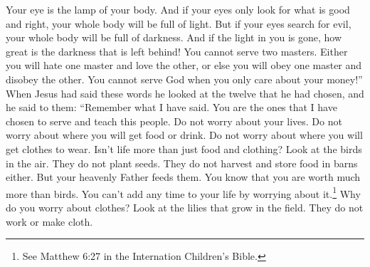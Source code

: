 Your eye is the lamp of your body. And if your eyes only look for what is good and right, your whole body will be full of light.
\bverse \iffalse But if thine eye be evil, thy whole body shall be full of darkness. If, therefore, the light that is in thee be darkness, how great is that darkness! \fi
But if your eyes search for evil, your whole body will be full of darkness. And if the light in you is gone, how great is the darkness that is left behind!
\bverse \iffalse No man can serve two masters; for either he will hate the one and love the other, or else he will hold to the one and despise the other. Ye cannot serve God and Mammon. \fi
You cannot serve two masters. Either you will hate one master and love the other, or else you will obey one master and disobey the other. You cannot serve God when you only care about your money!''
\bverse \iffalse And now it came to pass that when Jesus had spoken these words he looked upon the twelve whom he had chosen, and said unto them: Remember the words which I have spoken. For behold, ye are they whom I have chosen to minister unto this people. Therefore I say unto you, take no thought for your life, what ye shall eat, or what ye shall drink; nor yet for your body, what ye shall put on. Is not the life more than meat, and the body than raiment? \fi
When Jesus had said these words he looked at the twelve that he had chosen, and he said to them: ``Remember what I have said. You are the ones that I have chosen to serve and teach this people. Do not worry about your lives. Do not worry about where you will get food or drink. Do not worry about where you will get clothes to wear. Isn't life more than just food and clothing?
\bverse \iffalse Behold the fowls of the air, for they sow not, neither do they reap nor gather into barns; yet your heavenly Father feedeth them. Are ye not much better than they? \fi
Look at the birds in the air. They do not plant seeds. They do not harvest and store food in barns either. But your heavenly Father feeds them. You know that you are worth much more than birds. 
\bverse \iffalse Which of you by taking thought can add one cubit unto his stature? \fi
You can't add any time to your life by worrying about it.\footnote{See Matthew 6:27 in the Internation Children's Bible.}
\bverse \iffalse And why take ye thought for raiment? Consider the lilies of the field how they grow; they toil not, neither do they spin; \fi
Why do you worry about clothes? Look at the lilies that grow in the field. They do not work or make cloth.
